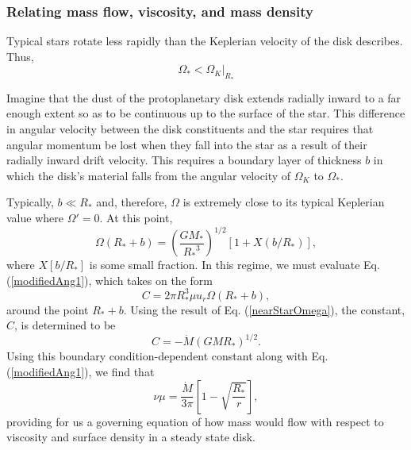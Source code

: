 \documentclass[aps,pra,twocolumn]{revtex4-1}
\begin{document}
\subsubsection{\label{section 2.2.1} Relating mass flow, viscosity, and mass density}
Typical stars rotate less rapidly than the Keplerian velocity of the disk describes.  Thus,
\begin{equation}
\Omega_* < \Omega_K\bigg|_{R_*}
\end{equation}

Imagine that the dust of the protoplanetary disk extends radially inward to a far enough extent so as to be continuous up to the surface of the star.  This difference in angular velocity between the disk constituents and the star requires that angular momentum be lost when they fall into the star as a result of their radially inward drift velocity.  This requires a boundary layer of thickness $b$ in which the disk's material falls from the angular velocity of $\Omega_K$ to $\Omega_*$.  

Typically, $b \ll R_*$ and, therefore, $\Omega$ is extremely close to its typical Keplerian value where $\Omega' = 0$.  At this point,
\begin{equation}
\Omega(R_* + b) = \left(\frac{GM_*}{{R_*}^3} \right)^{1/2} \left[1 + X(b/R_*) \right], \label{nearStarOmega}
\end{equation}
where $X[b/R_*]$ is some small fraction.  In this regime, we must evaluate Eq. (\ref{modifiedAng1}), which takes on the form
\begin{equation}
C = 2\pi R_*^3 \mu u_r \Omega(R_* + b) , \nonumber
\end{equation}
around the point $R_* + b$.  Using the result of Eq. (\ref{nearStarOmega}), the constant, $C$,  is determined to be
\begin{equation}
C = - \dot{M}(G M R_*)^{1/2}. \nonumber
\end{equation}
Using this boundary condition-dependent constant along with Eq. (\ref{modifiedAng1}), we find that
\begin{equation}
\nu \mu = \frac{\dot{M}}{3\pi}\left[ 1 - \sqrt{\frac{R_*}{r}} \right], \label{massFlow}
\end{equation}
providing for us a governing equation of how mass would flow with respect to viscosity and surface density in a steady state disk.
\end{document}

